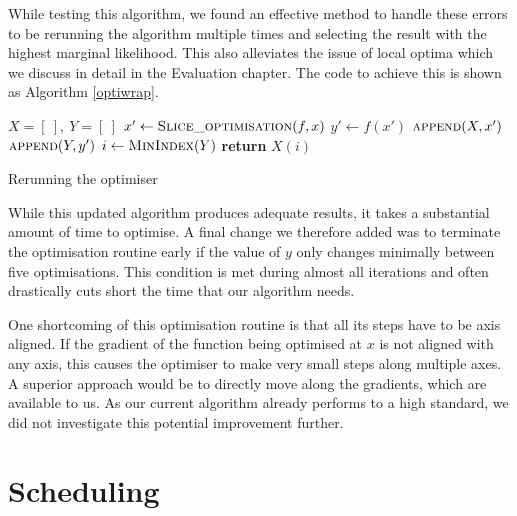 \documentclass[a4paper,12pt,twoside,openright]{report}
\begin{document}
While testing this algorithm, we found an effective method to handle these errors to be rerunning the algorithm multiple times and selecting the result with the highest marginal likelihood. This also alleviates the issue of local optima which we discuss in detail in the Evaluation chapter. The code to achieve this is shown as Algorithm \ref{optiwrap}.

\begin{algorithm}
\begin{algorithmic}[1]
\State $X = [\ ],\ Y = [\ ]$
\State $x'\gets \Call{Slice\_optimisation}{f, x}$
\State $y'\gets f(x')$
\State $\Call{append}{X, x'}$
\State $\Call{append}{Y, y'}$
\EndFor
\State $i\gets \Call{MinIndex}{Y}$
\State \textbf{return} $X(i)$
\EndProcedure
\end{algorithmic}
\caption{Rerunning the optimiser}
\label{optiwrap}
\end{algorithm}

While this updated algorithm produces adequate results, it takes a substantial amount of time to optimise. A final change we therefore added was to terminate the optimisation routine early if the value of $y$ only changes minimally between five optimisations. This condition is met during almost all iterations and often drastically cuts short the time that our algorithm needs.

One shortcoming of this optimisation routine is that all its steps have to be axis aligned. If the gradient of the function being optimised at $x$ is not aligned with any axis, this causes the optimiser to make very small steps along multiple axes. A superior approach would be to directly move along the gradients, which are available to us. As our current algorithm already performs to a high standard, we did not investigate this potential improvement further.







\section{Scheduling} 

\end{document}

